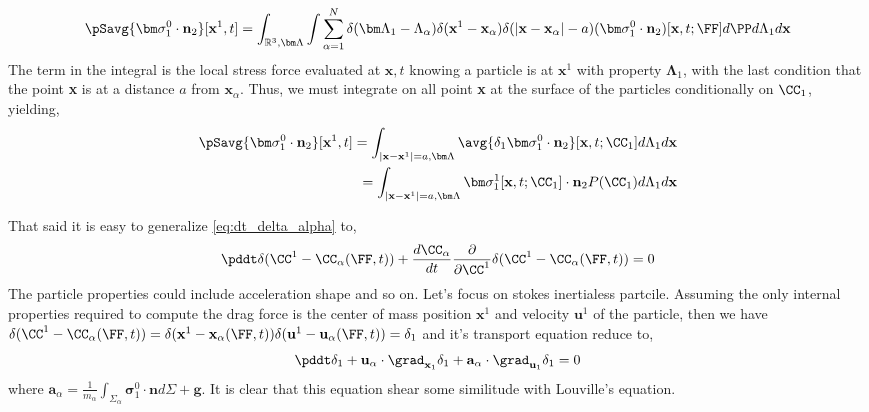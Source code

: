 \begin{align*}
    \pSavg{\bm\sigma_1^0\cdot\textbf{n}_2}[\textbf{x}^1,t]
    = 
    \int_{\mathbb{R}^3,\bm\Lambda}
    \int
    \sum_{\alpha=1}^N 
    \delta(\bm\Lambda_1 - \Lambda_\alpha) 
    \delta(\textbf{x}^1-\textbf{x}_\alpha)
    \delta(|\textbf{x} - \textbf{x}_{\alpha}|-a)
    (\bm\sigma_1^0\cdot\textbf{n}_2)[\textbf{x},t;\FF]
    d\PP
    d\Lambda_1
    d\textbf{x}\\
\end{align*}
The term in the integral is the local stress force evaluated at $\textbf{x},t$ knowing a particle is at $\textbf{x}^1$ with property $\bm\Lambda_1$, with the last condition that the point \textbf{x} is at a distance $a$ from $\textbf{x}_\alpha$. 
Thus, we must integrate on all point \textbf{x} at the surface of the particles conditionally on $\CC_1$, yielding,   
\begin{align*}
    \pSavg{\bm\sigma_1^0\cdot\textbf{n}_2}[\textbf{x}^1,t]
    = 
    \int_{|\textbf{x}-\textbf{x}^1| = a,\bm\Lambda}
    \avg{\delta_1\bm\sigma_1^0\cdot\textbf{n}_2}[\textbf{x},t;\CC_1]
    d\Lambda_1
    d\textbf{x}\\
    = 
    \int_{|\textbf{x}-\textbf{x}^1| = a,\bm\Lambda}
    \bm\sigma_1^1[\textbf{x},t;\CC_1]\cdot\textbf{n}_2P(\CC_1)
    d\Lambda_1
    d\textbf{x}\\
\end{align*}

That said it is easy to generalize \ref{eq:dt_delta_alpha} to, 
\begin{equation*}
    \pddt \delta(\CC^1 - \CC_\alpha(\FF,t))
    + \frac{d \CC_\alpha}{dt}
    \frac{\partial }{\partial \CC^1} \delta(\CC^1 - \CC_\alpha(\FF,t))
    = 0 
\end{equation*}
The particle properties could include acceleration shape and so on.
Let's focus on stokes inertialess partcile. 
Assuming the only internal properties required to compute the drag force is the center of mass position $\textbf{x}^1$ and velocity $\textbf{u}^1$ of the particle, then we have $\delta(\CC^1 - \CC_\alpha(\FF,t)) =\delta(\textbf{x}^1 - \textbf{x}_\alpha(\FF,t)) \delta(\textbf{u}^1 - \textbf{u}_\alpha(\FF,t)) = \delta_1 $ and it's transport equation reduce to, 
\begin{equation*}
    \pddt \delta_1
    + 
    \textbf{u}_\alpha \cdot \grad_{\textbf{x}_1} \delta_1
    + \textbf{a}_\alpha \cdot \grad_{\textbf{u}_1} \delta_1
    = 0 
\end{equation*}
where $\textbf{a}_\alpha = \frac{1}{m_\alpha}\int_{\Sigma_\alpha} \bm\sigma_1^0 \cdot \textbf{n} d\Sigma + \textbf{g}$.  
It is clear that this equation shear some similitude with Louville's equation. 

